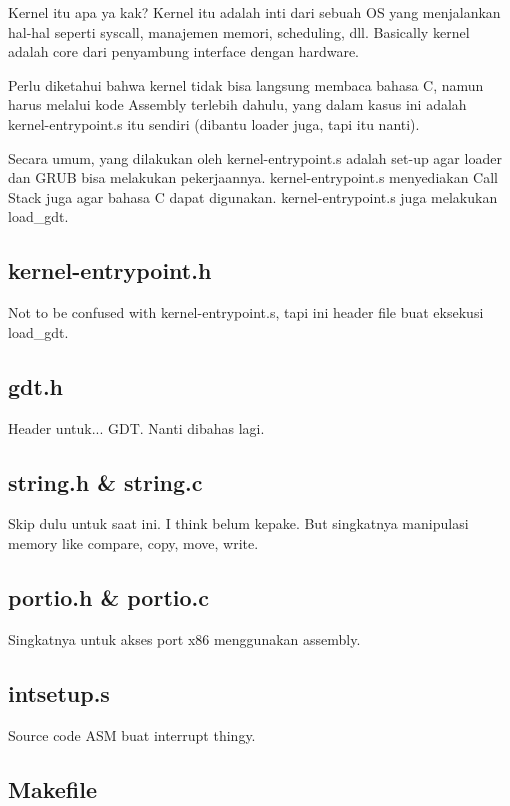 Kernel itu apa ya kak? Kernel itu adalah inti dari sebuah OS yang menjalankan hal-hal seperti syscall, manajemen memori, scheduling, dll. Basically kernel adalah core dari penyambung interface dengan hardware.

Perlu diketahui bahwa kernel tidak bisa langsung membaca bahasa C, namun harus melalui kode Assembly terlebih dahulu, yang dalam kasus ini adalah kernel-entrypoint.s itu sendiri (dibantu loader juga, tapi itu nanti).

Secara umum, yang dilakukan oleh kernel-entrypoint.s adalah set-up agar loader dan GRUB bisa melakukan pekerjaannya. kernel-entrypoint.s menyediakan Call Stack juga agar bahasa C dapat digunakan. kernel-entrypoint.s juga melakukan load\_gdt.

\subsection{kernel-entrypoint.h}

Not to be confused with kernel-entrypoint.s, tapi ini header file buat eksekusi load\_gdt.

\subsection{gdt.h}

Header untuk... GDT. Nanti dibahas lagi.

\subsection{string.h \& string.c}

Skip dulu untuk saat ini. I think belum kepake. But singkatnya manipulasi memory like compare, copy, move, write.

\subsection{portio.h \& portio.c}

Singkatnya untuk akses port x86 menggunakan assembly.

\subsection{intsetup.s}

Source code ASM buat interrupt thingy.

\subsection{Makefile}

